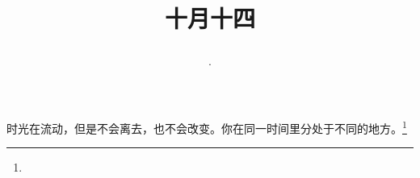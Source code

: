 \title{\date[d=14,m=11,y=2024][year:cn-y,年,month:cn,day:cn,日,·,weekday]·十月十四 }
时光在流动，但是不会离去，也不会改变。你在同一时间里分处于不同的地方。\footnote{ }

